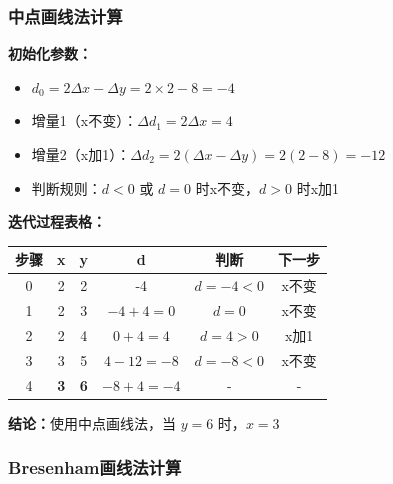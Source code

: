 \documentclass[12pt,a4paper]{article}
\begin{document}
\subsubsection{中点画线法计算}

\begin{tcolorbox}
\textbf{初始化参数：}
\begin{itemize}
    \item $d_0 = 2\Delta x - \Delta y = 2 \times 2 - 8 = -4$
    \item 增量1（x不变）：$\Delta d_1 = 2\Delta x = 4$
    \item 增量2（x加1）：$\Delta d_2 = 2(\Delta x - \Delta y) = 2(2-8) = -12$
    \item 判断规则：$d < 0$ 或 $d = 0$ 时x不变，$d > 0$ 时x加1
\end{itemize}

\textbf{迭代过程表格：}

\begin{center}
\begin{tabular}{|c|c|c|c|c|c|}
\hline
\textbf{步骤} & \textbf{x} & \textbf{y} & \textbf{d} & \textbf{判断} & \textbf{下一步} \\
\hline
0 & 2 & 2 & -4 & $d=-4<0$ & x不变 \\
\hline
1 & 2 & 3 & $-4+4=0$ & $d=0$ & x不变 \\
\hline
2 & 2 & 4 & $0+4=4$ & $d=4>0$ & x加1 \\
\hline
3 & 3 & 5 & $4-12=-8$ & $d=-8<0$ & x不变 \\
\hline
4 & \textbf{3} & \textbf{6} & $-8+4=-4$ & - & - \\
\hline
\end{tabular}
\end{center}

\textbf{结论：}使用中点画线法，当 $y = 6$ 时，$\boxed{x = 3}$
\end{tcolorbox}

\subsubsection{Bresenham画线法计算}
\end{document}
